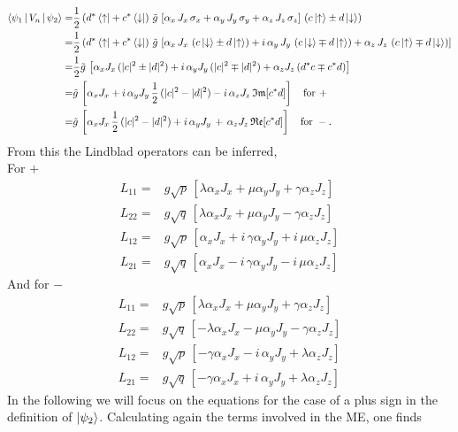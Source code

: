 \documentclass{article}
\begin{document}
\begin{align*}
    \Braket{\psi_{1}| V_n| \psi_{2}}=&\frac{1}{2}\left(d^*\bra{\uparrow}+ c^*\bra{\downarrow}\right) \,\tilde{g}\,\left[\alpha_x\,J_x\,\sigma_x+\alpha_y\,J_y\,\sigma_y+\alpha_z\,J_z\,\sigma_z\right] \,\left(c\ket{\uparrow}\pm d\ket{\downarrow}\right)\\
    =&\frac{1}{2}\left(d^*\bra{\uparrow}+ c^*\bra{\downarrow}\right) \,\tilde{g}\,\left[\alpha_x\,J_x\,\left(c\ket{\downarrow}\pm d\ket{\uparrow}\right)+i\,\alpha_y\,J_y\,\left(c\ket{\downarrow}\mp d\ket{\uparrow}\right)+\alpha_z\,J_z\,\left(c\ket{\uparrow}\mp d\ket{\downarrow}\right)\right]\\
    =&\frac{1}{2}\tilde{g}\,\left[\alpha_xJ_x\,(|c|^2\pm |d|^2 ) + i\,\alpha_yJ_y\,(|c|^2\mp |d|^2 ) + \alpha_zJ_z\,(d^*c\mp c^*d)\right]\\
    =&\tilde{g}\,\left[\alpha_xJ_x+ i\,\alpha_yJ_y\,\frac{1}{2}\,(|c|^2 - |d|^2 ) -i\, \alpha_zJ_z\,\mathfrak{Im}[c^*d]\right]\quad\text{for }+\\
    =&\tilde{g}\,\left[\alpha_xJ_x\,\frac{1}{2}\,(|c|^2 - |d|^2 )+ i\,\alpha_yJ_y\, +\, \alpha_zJ_z\,\mathfrak{Re}[c^*d]\right]\quad\text{for }-.
\end{align*}
From this the Lindblad operators can be inferred,\\
For $+$
\begin{align*}
    L_{11}=&g\sqrt{p}\,\left[\lambda \alpha_xJ_x +\mu\alpha_yJ_y +\gamma\alpha_zJ_z\right]\\
    L_{22}=&g\sqrt{q}\,\left[\lambda \alpha_xJ_x +\mu\alpha_yJ_y -\gamma\alpha_zJ_z\right]\\
    L_{12}=&g\sqrt{p}\,\left[\alpha_xJ_x +i\,\gamma\alpha_yJ_y +i\,\mu \alpha_zJ_z\right]\\
    L_{21}=&g\sqrt{q}\,\left[\alpha_xJ_x -i\,\gamma\alpha_yJ_y -i\,\mu \alpha_zJ_z\right]
\end{align*}
And for $-$
\begin{align*}
    L_{11}=&g\sqrt{p}\,\left[\lambda \alpha_xJ_x +\mu\alpha_yJ_y +\gamma\alpha_zJ_z\right]\\
    L_{22}=&g\sqrt{q}\,\left[-\lambda \alpha_xJ_x -\mu\alpha_yJ_y -\gamma\alpha_zJ_z\right]\\
    L_{12}=&g\sqrt{p}\,\left[-\gamma\alpha_xJ_x -i\,\alpha_yJ_y +\lambda \alpha_zJ_z\right]\\
    L_{21}=&g\sqrt{q}\,\left[-\gamma\alpha_xJ_x +i\,\alpha_yJ_y +\lambda \alpha_zJ_z\right]
\end{align*}
In the following we will focus on the equations for the case of a plus sign in the definition of $\ket{\psi_2}$. Calculating again the terms involved in the ME, one finds
\end{document}
